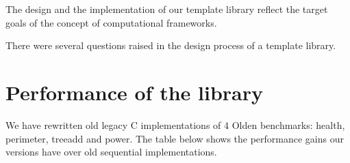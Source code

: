 \quad The design and the implementation of our template library reflect the target goals of the concept of computational frameworks.    

\quad There were several questions raised in the design process of a template library. 

\section{Performance of the library}
\label{computational_frameworks_performance}
\quad We have rewritten old legacy C implementations of 4 Olden benchmarks: health, perimeter, treeadd and power. The table below shows the performance gains our versions have over old sequential implementations.   




